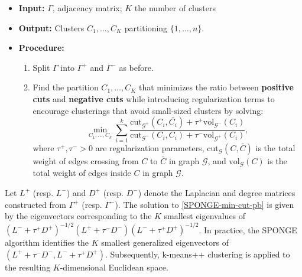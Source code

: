 \documentclass[sigconf]{acmart}
\begin{document}
\begin{itemize}
    \item \textbf{Input:} $\Gamma$, adjacency matrix; $K$ the number of clusters
    \item \textbf{Output:} Clusters $C_1, \ldots, C_K$ partitioning $\{1, \ldots, n\}$.
    \item \textbf{Procedure: }
    \begin{enumerate}
        \item Split $\Gamma$ into $\Gamma^+$ and $\Gamma^-$ as before.
        \item Find the partition $C_1, \ldots, C_K$ that minimizes the ratio between \textbf{positive cuts} and \textbf{negative cuts} while introducing regularization terms to encourage clusterings that avoid small-sized clusters by solving:
        \begin{equation}
            \min_{C_1,\ldots,C_k} \sum_{i=1}^{k} \frac{\text{cut}_{\mathcal{G}^+}(C_i, \bar{C_i}) + \tau^+ \text{vol}_{\mathcal{G}^-}(C_i)}{\text{cut}_{\mathcal{G}^-}(C_i, C_i) + \tau^- \text{vol}_{\mathcal{G}^+}(C_i)}, 
            \label{SPONGE-min-cut-pb} 
        \end{equation} 
        where $\tau^+, \tau^- > 0$ are regularization parameters, $\text{cut}_{\mathcal{G}}(C, \bar{C})$ is the total weight of edges crossing from $C$ to $\bar{C}$ in graph $\mathcal{G}$, and $\text{vol}_{\mathcal{G}}(C)$ is the total weight of edges inside $C$ in graph $\mathcal{G}$.
    \end{enumerate}
\end{itemize}

Let $L^+$ (resp. $L^-$) and $D^+$ (resp. $D^-$) denote the Laplacian and degree matrices constructed from $\Gamma^+$ (resp. $\Gamma^-$). The solution to \eqref{SPONGE-min-cut-pb} is given by the eigenvectors corresponding to the \( K \) smallest eigenvalues of $\left( L^- + \tau^+ D^+ \right)^{-1/2} \left( L^+ + \tau^- D^- \right) \left( L^- + \tau^+ D^+ \right)^{-1/2}$. In practice, the SPONGE algorithm identifies the $K$ smallest generalized eigenvectors of $(L^+ + \tau^- D^-, L^- + \tau^+ D^+)$. Subsequently, k-means++ clustering is applied to the resulting $K$-dimensional Euclidean space.
\end{document}
